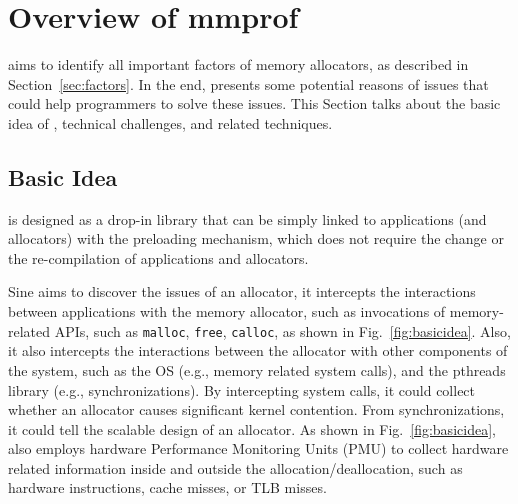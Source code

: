 \section{Overview of mmprof}

\MP{} aims to identify all important factors of memory allocators, as described in Section~\ref{sec:factors}. In the end, \MP{} presents some potential reasons of issues that could help programmers to solve these issues. This Section talks about the basic idea of \MP{}, technical challenges, and related techniques.  

\subsection{Basic Idea}

\MP{} is designed as a drop-in library that can be simply linked to applications (and allocators) with the preloading mechanism, which does not require the change or the re-compilation of applications and allocators.

Sine \MP{} aims to discover the issues of an  allocator, it intercepts the interactions between applications with the memory allocator, such as invocations of memory-related APIs, such as \texttt{malloc}, \texttt{free}, \texttt{calloc}, as shown in Fig.~\ref{fig:basicidea}. Also, it also intercepts the interactions between the allocator with other components of the system, such as the OS (e.g., memory related system calls), and the pthreads library (e.g., synchronizations). By intercepting system calls, it could collect whether an allocator causes significant kernel contention. From synchronizations, it could tell the scalable design of an allocator. As shown in Fig.~\ref{fig:basicidea}, \MP{} also employs hardware Performance Monitoring Units (PMU) to collect hardware related information inside and outside the allocation/deallocation, such as hardware instructions, cache misses, or TLB misses. %
 
